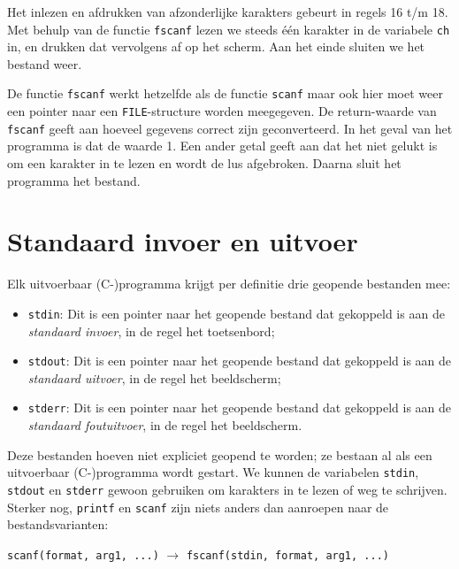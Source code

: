 
Het inlezen en afdrukken van afzonderlijke karakters gebeurt in regels 16 t/m 18. Met behulp van de functie \texttt{fscanf} lezen we steeds één karakter in de variabele \texttt{ch} in, en drukken dat vervolgens af op het scherm. Aan het einde sluiten we het bestand weer.

De functie \texttt{fscanf} werkt hetzelfde als de functie \texttt{scanf} maar ook hier moet weer een pointer naar een \texttt{FILE}-structure worden meegegeven. De return-waarde van \texttt{fscanf} geeft aan hoeveel gegevens correct zijn geconverteerd. In het geval van het programma is dat de waarde 1. Een ander getal geeft aan dat het niet gelukt is om een karakter in te lezen en wordt de lus afgebroken. Daarna sluit het programma het bestand.


\section{Standaard invoer en uitvoer}
\label{sec:stdin}
Elk uitvoerbaar (C-)programma krijgt per definitie drie geopende bestanden mee:

\begin{itemize}
\item \texttt{stdin}: Dit is een pointer naar het geopende bestand dat gekoppeld is aan de \textsl{standaard invoer}, in de regel het toetsenbord;
\item \texttt{stdout}: Dit is een pointer naar het geopende bestand dat gekoppeld is aan de \textsl{standaard uitvoer}, in de regel het beeldscherm;
\item \texttt{stderr}: Dit is een pointer naar het geopende bestand dat gekoppeld is aan de \textsl{standaard foutuitvoer}, in de regel het beeldscherm.
\end{itemize}

Deze bestanden hoeven niet expliciet geopend te worden; ze bestaan al als een uitvoerbaar (C-)programma wordt gestart. We kunnen de variabelen \texttt{stdin}, \texttt{stdout} en \texttt{stderr} gewoon gebruiken om karakters in te lezen of weg te schrijven. Sterker nog, \texttt{printf} en \texttt{scanf} zijn niets anders dan aanroepen naar de bestandsvarianten:

\hspace*{1em}\texttt{scanf(format, arg1, ...)} \quad $\longrightarrow$ \quad \texttt{fscanf(stdin, format, arg1, ...)}

